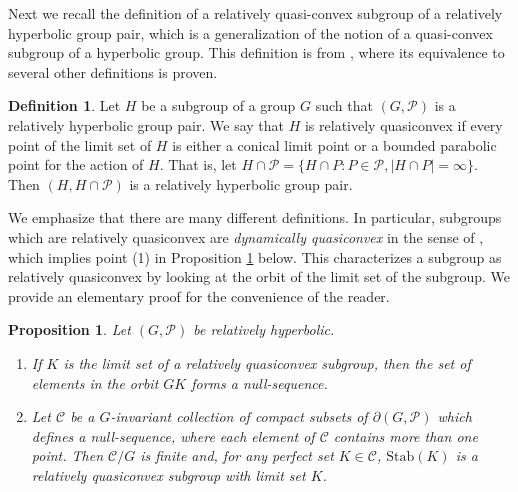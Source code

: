 \documentclass[11pt]{article}
\newtheorem{proposition}[theorem]{Proposition}
\theoremstyle{definition}
\newtheorem{definition}[theorem]{Definition}
\newcommand\CCC{\mathcal{C}}
\newcommand\PP{\mathcal{P}}
\newcommand\Stab{\text{Stab}}
\begin{document}
 Next we recall the definition of a relatively quasi-convex subgroup of a relatively hyperbolic group pair, which is a generalization of the notion of a quasi-convex subgroup of a hyperbolic group.  This definition is from \cite{Hruskasurvey}, where its equivalence to several other definitions is proven. 
\begin{definition} Let $H$ be a subgroup of a group $G$ such that $(G, \mathcal{P})$ is a relatively hyperbolic group pair.  We say that $H$ is relatively quasiconvex if every point of the limit set of $H$ is either a conical limit point or a bounded parabolic point for the action of $H$. That is, let $H \cap \mathcal{P} = \lbrace H \cap P: P \in \mathcal{P}, |H\cap P| = \infty \rbrace$. Then $(H, H \cap \mathcal{P})$ is a relatively hyperbolic group pair. 
\end{definition}


 We emphasize that there are many different definitions. In particular, subgroups which are relatively quasiconvex are {\it dynamically quasiconvex} in the sense of \cite[Definition 4.9]{GPdyn}, which implies point (1) in Proposition \ref{prop:nullseq} below.  This characterizes a subgroup as relatively quasiconvex by looking at the orbit of the limit set of the subgroup.  We provide an elementary proof for the convenience of the reader. 

\begin{proposition}\label{prop:nullseq} Let $(G,\PP)$ be relatively hyperbolic.
\begin{enumerate}
\item If $K$ is the limit set of a relatively quasiconvex subgroup, then the set of elements in the orbit $GK$ forms a null-sequence. 

\item Let $\CCC$ be a $G$-invariant collection of compact subsets of $\partial( G,\PP)$ which defines a null-sequence, where each element of $\CCC$ contains more than one point. 
Then $\CCC/G$ is finite and, for any  perfect set $K\in\CCC$, $\Stab (K)$ is a relatively quasiconvex subgroup with
limit set $K$. 
\end{enumerate}
\end{proposition}
\end{document}
